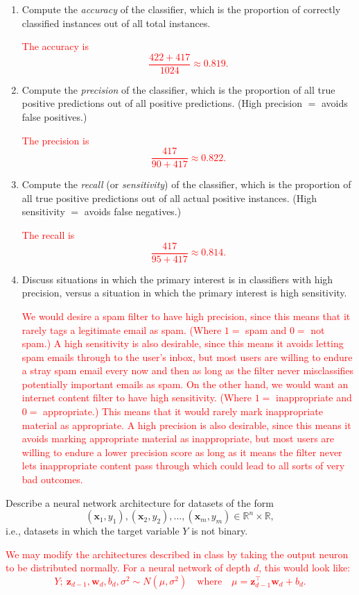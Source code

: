 \documentclass[12pt,reqno]{amsart}
\begin{document}
\medskip
\begin{enumerate}
\item Compute the \textit{accuracy} of the classifier, which is the proportion of correctly classified instances out of all total instances.

\bigskip
\textcolor{red}{The accuracy is
	\[\frac{422 + 417}{1024} \approx 0.819.
	\]}
\bigskip

\item Compute the \textit{precision} of the classifier, which is the proportion of all true positive predictions out of all positive predictions. (High precision $=$ avoids false positives.)

\bigskip
\textcolor{red}{The precision is
	\[\frac{417}{90 + 417} \approx 0.822.
	\]}
\bigskip

\item Compute the \textit{recall} (or \textit{sensitivity}) of the classifier, which is the proportion of all true positive predictions out of all actual positive instances. (High sensitivity $=$ avoids false negatives.)

\bigskip
\textcolor{red}{The recall is
	\[\frac{417}{95 + 417} \approx 0.814.
	\]}
\bigskip

\item Discuss situations in which the primary interest is in classifiers with high precision, versus a situation in which the primary interest is high sensitivity.

\bigskip
\textcolor{red}{We would desire a spam filter to have high precision, since this means that it rarely tags a legitimate email as spam. (Where $1=$ spam and $0=$ not spam.) A high sensitivity is also desirable, since this means it avoids letting spam emails through to the user's inbox, but most users are willing to endure a stray spam email every now and then as long as the filter never misclassifies potentially important emails as spam. On the other hand, we would want an internet content filter to have high sensitivity. (Where $1=$ inappropriate and $0=$ appropriate.) This means that it would rarely mark inappropriate material as appropriate. A high precision is also desirable, since this means it avoids marking appropriate material as inappropriate, but most users are willing to endure a lower precision score as long as it means the filter never lets inappropriate content pass through which could lead to all sorts of very bad outcomes.}
\bigskip
\end{enumerate}








\prob Describe a neural network architecture for datasets of the form
	\[(\mathbf{x}_1,y_1),(\mathbf{x}_2,y_2),\ldots,(\mathbf{x}_m,y_m) \in \mathbb{R}^n \times \mathbb{R},
	\]
i.e., datasets in which the target variable $Y$ is not binary.

\bigskip
\textcolor{red}{We may modify the architectures described in class by taking the output neuron to be distributed normally. For a neural network of depth $d$, this would look like:
	\[Y ;\  \mathbf{z}_{d-1}, \mathbf{w}_d, b_d, \sigma^2 \sim N(\mu,\sigma^2) \quad \text{where} \quad \mu = \mathbf{z}_{d-1} ^\intercal \mathbf{w}_d + b_d.
	\]}
\end{document}
